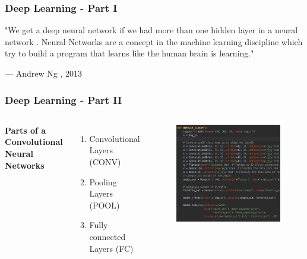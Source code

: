 \documentclass{beamer}
\begin{document}
%
\begin{frame}
\frametitle{Deep Learning - Part I}
\epigraph{"We get a deep neural network if we had more than one hidden layer in a neural network . Neural Networks are a concept in the machine learning discipline which try to build a program that learns like the human brain is learning."}{--- \textup{Andrew Ng }, 2013}
\end{frame}
%
%
\begin{frame}
\frametitle{Deep Learning - Part II}
\begin{columns}[c] 
\textbf{Parts of a Convolutional Neural Networks}
\begin{enumerate}
\item Convolutional Layers (CONV)
\item Pooling Layers (POOL)
\item Fully connected Layers (FC)
\end{enumerate}
\begin{figure}
\includegraphics[width=1.05\linewidth]{photo/code.png}
\end{figure}
\end{columns}
\end{frame}
\end{document}
